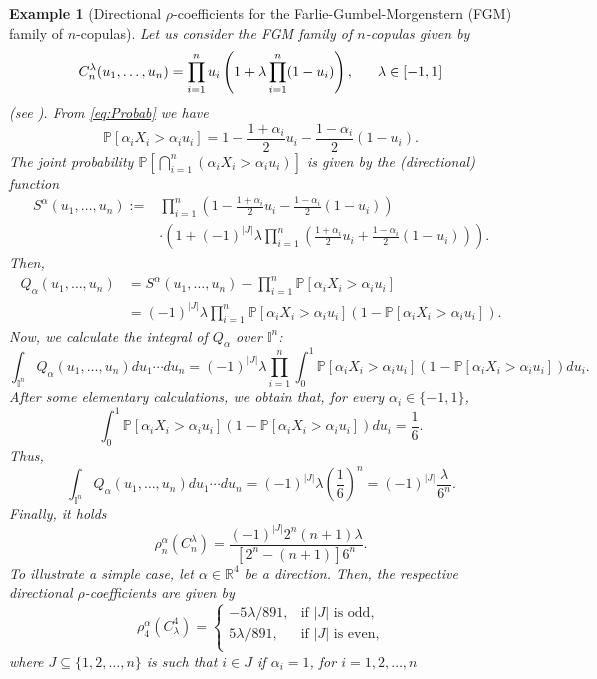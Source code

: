 \documentclass[11pt,a4paper]{article}
\newcommand{\I}{\mbox{${\rm I\!I}$}}
\newtheorem{example}{Example}
\def\I{{\mathbb I}}
\begin{document}
\begin{example}[Directional $\rho$-coefficients for the Farlie-Gumbel-Morgenstern (FGM) family of $n$-copulas] \label{ex:FGM}Let us consider the FGM family of $n$-copulas given by
$$C_n^{\lambda}(u_1,\ldots,u_n)=\prod_{i=1}^nu_i\left(1+\lambda\prod_{i=1}^n(1-u_i)\right),\hspace{0.6cm}\lambda\in[-1,1]$$
(see \cite{Durante2016book,Ne06}). From \eqref{eq:Probab} we have
$$\mathbb{P}[\alpha_iX_i>\alpha_iu_i]=1-\frac{1+\alpha_i}{2}u_i-\frac{1-\alpha_i}{2}(1-u_i).$$
The joint probability $\mathbb{P}[\bigcap_{i=1}^n(\alpha_iX_i>\alpha_iu_i)]$ is given by the (directional) function 
\begin{align*}
    S^\alpha(u_1,\ldots,u_n):=&\prod_{i=1}^n\left(1-\frac{1+\alpha_i}{2}u_i-\frac{1-\alpha_i}{2}(1-u_i)\right)\\
    &\cdot\left(1+(-1)^{|J|}\lambda\prod_{i=1}^n\left(\frac{1+\alpha_i}{2}u_i+\frac{1-\alpha_i}{2}(1-u_i)\right)\right).
\end{align*}
Then, 
\begin{align*}
    Q_\alpha(u_1,\ldots,u_n)&=S^\alpha(u_1,\ldots,u_n)-\prod_{i=1}^n\mathbb{P}[\alpha_iX_i>\alpha_iu_i]\\
    &=(-1)^{|J|}\lambda\prod_{i=1}^n\mathbb{P}[\alpha_iX_i>\alpha_iu_i](1-\mathbb{P}[\alpha_iX_i>\alpha_iu_i]).
\end{align*}
Now, we calculate the integral of $Q_\alpha$ over $\I^n$:
$$\int_{\mathbb{I}^n}Q_\alpha(u_1,\ldots,u_n)du_1\cdots du_n=(-1)^{|J|}\lambda\prod_{i=1}^n\int_0^1\mathbb{P}[\alpha_iX_i>\alpha_iu_i](1-\mathbb{P}[\alpha_iX_i>\alpha_iu_i])du_i.$$
After some elementary calculations, we obtain that, for every $\alpha_i\in\{-1,1\}$,
$$\int_0^1\mathbb{P}[\alpha_iX_i>\alpha_iu_i](1-\mathbb{P}[\alpha_iX_i>\alpha_iu_i])du_i=\frac{1}{6}.$$
Thus, 
$$\int_{\mathbb{I}^n}Q_\alpha(u_1,\ldots,u_n)du_1\cdots du_n=(-1)^{|J|}\lambda\left(\frac{1}{6}\right)^n=(-1)^{|J|}\frac{\lambda}{6^n}.$$
Finally, it holds
$$\rho_n^\alpha(C_n^{\lambda})=\frac{(-1)^{|J|}2^n(n+1)\lambda}{[2^n-(n+1)]6^n}.$$
To illustrate a simple case, let $\alpha\in\mathbb{R}^4$  be a direction. Then, the respective directional $\rho$-coefficients are given by 
 $$\rho_4^\alpha(C_\lambda^4)=\begin{cases}
     -5\lambda/891, & \text{if } |J| \text{ is odd,}\\
     5\lambda/891, & \text{if } |J| \text{ is even,}\\
 \end{cases}$$
 where $J\subseteq\{1,2,\ldots,n\}$ is such that $i\in J$ if $\alpha_i=1$, for $i=1,2,\ldots,n$
 \end{example}
\end{document}
